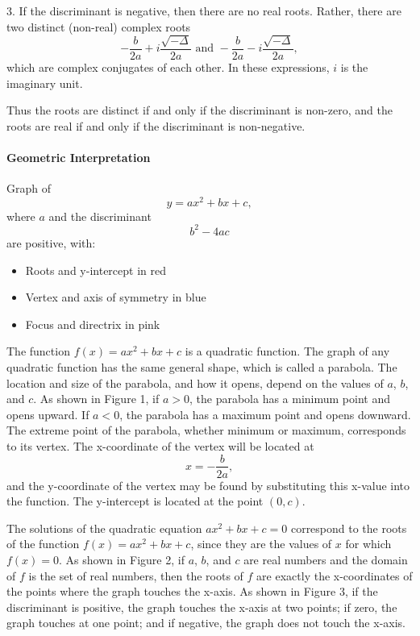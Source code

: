 3. If the discriminant is negative, then there are no real roots. Rather, there are two distinct (non-real) complex roots
   $$-\frac{b}{2a} + i \frac{\sqrt{-\Delta}}{2a} \text{ and } -\frac{b}{2a} - i \frac{\sqrt{-\Delta}}{2a},$$
   which are complex conjugates of each other. In these expressions, $i$ is the imaginary unit.

Thus the roots are distinct if and only if the discriminant is non-zero, and the roots are real if and only if the discriminant is non-negative.

\paragraph{Geometric Interpretation}

Graph of 
$$y = ax^2 + bx + c,$$ 
where $a$ and the discriminant 
$$b^2 - 4ac$$ 
are positive, with:
\begin{itemize}
    \item Roots and y-intercept in red
    \item Vertex and axis of symmetry in blue
    \item Focus and directrix in pink
\end{itemize}


The function $f(x) = ax^2 + bx + c$ is a quadratic function. The graph of any quadratic function has the same general shape, which is called a parabola. The location and size of the parabola, and how it opens, depend on the values of $a$, $b$, and $c$. As shown in Figure 1, if $a > 0$, the parabola has a minimum point and opens upward. If $a < 0$, the parabola has a maximum point and opens downward. The extreme point of the parabola, whether minimum or maximum, corresponds to its vertex. The x-coordinate of the vertex will be located at 
$$x = -\frac{b}{2a},$$ 
and the y-coordinate of the vertex may be found by substituting this x-value into the function. The y-intercept is located at the point $(0, c)$.

The solutions of the quadratic equation $ax^2 + bx + c = 0$ correspond to the roots of the function $f(x) = ax^2 + bx + c$, since they are the values of $x$ for which $f(x) = 0$. As shown in Figure 2, if $a$, $b$, and $c$ are real numbers and the domain of $f$ is the set of real numbers, then the roots of $f$ are exactly the x-coordinates of the points where the graph touches the x-axis. As shown in Figure 3, if the discriminant is positive, the graph touches the x-axis at two points; if zero, the graph touches at one point; and if negative, the graph does not touch the x-axis.

